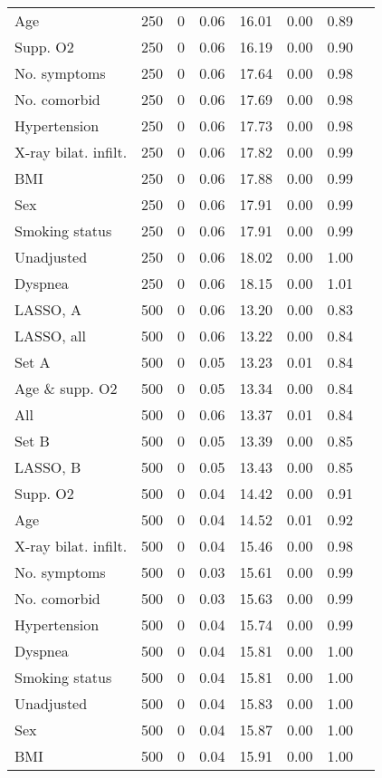 \documentclass{article}
\begin{document}
{\begin{longtable}{lccccccc}
Age & 250 & 0 & 0.06 & 16.01 & 0.00 & 0.89\\
Supp. O2 & 250 & 0 & 0.06 & 16.19 & 0.00 & 0.90\\
No. symptoms & 250 & 0 & 0.06 & 17.64 & 0.00 & 0.98\\
No. comorbid & 250 & 0 & 0.06 & 17.69 & 0.00 & 0.98\\
Hypertension & 250 & 0 & 0.06 & 17.73 & 0.00 & 0.98\\
X-ray bilat. infilt. & 250 & 0 & 0.06 & 17.82 & 0.00 & 0.99\\
BMI & 250 & 0 & 0.06 & 17.88 & 0.00 & 0.99\\
Sex & 250 & 0 & 0.06 & 17.91 & 0.00 & 0.99\\
Smoking status & 250 & 0 & 0.06 & 17.91 & 0.00 & 0.99\\
Unadjusted & 250 & 0 & 0.06 & 18.02 & 0.00 & 1.00\\
Dyspnea & 250 & 0 & 0.06 & 18.15 & 0.00 & 1.01\\ \midrule
LASSO, A & 500 & 0 & 0.06 & 13.20 & 0.00 & 0.83\\
LASSO, all & 500 & 0 & 0.06 & 13.22 & 0.00 & 0.84\\
Set A & 500 & 0 & 0.05 & 13.23 & 0.01 & 0.84\\
Age \& supp. O2 & 500 & 0 & 0.05 & 13.34 & 0.00 & 0.84\\
All & 500 & 0 & 0.06 & 13.37 & 0.01 & 0.84\\
Set B & 500 & 0 & 0.05 & 13.39 & 0.00 & 0.85\\
LASSO, B & 500 & 0 & 0.05 & 13.43 & 0.00 & 0.85\\
Supp. O2 & 500 & 0 & 0.04 & 14.42 & 0.00 & 0.91\\
Age & 500 & 0 & 0.04 & 14.52 & 0.01 & 0.92\\
X-ray bilat. infilt. & 500 & 0 & 0.04 & 15.46 & 0.00 & 0.98\\
No. symptoms & 500 & 0 & 0.03 & 15.61 & 0.00 & 0.99\\
No. comorbid & 500 & 0 & 0.03 & 15.63 & 0.00 & 0.99\\
Hypertension & 500 & 0 & 0.04 & 15.74 & 0.00 & 0.99\\
Dyspnea & 500 & 0 & 0.04 & 15.81 & 0.00 & 1.00\\
Smoking status & 500 & 0 & 0.04 & 15.81 & 0.00 & 1.00\\
Unadjusted & 500 & 0 & 0.04 & 15.83 & 0.00 & 1.00\\
Sex & 500 & 0 & 0.04 & 15.87 & 0.00 & 1.00\\
BMI & 500 & 0 & 0.04 & 15.91 & 0.00 & 1.00\\ \midrule

\end{longtable}}
\end{document}
